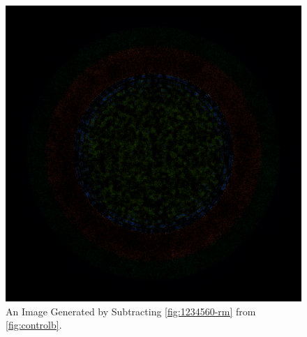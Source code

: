 \begin{figure}[H]
\centering
\includegraphics[width=0.6\linewidth]{figures/shuffle/diff-1234560}
\caption{An Image Generated by Subtracting \ref{fig:1234560-rm} from \ref{fig:controlb}.}
\label{fig:diff-1234560}
\end{figure}